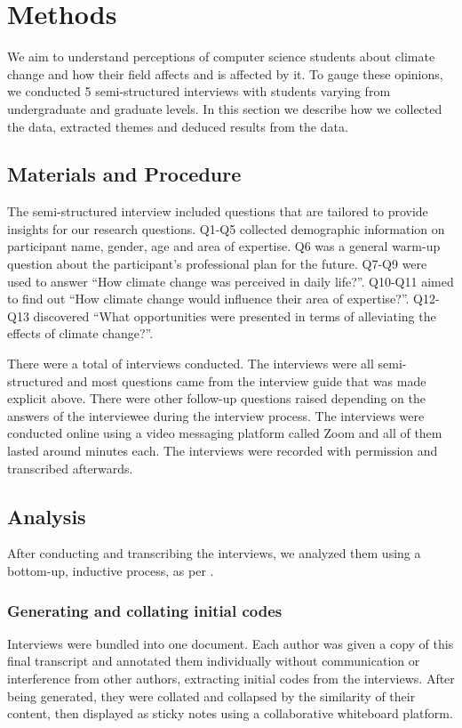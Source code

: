 

\section{Methods}

We aim to understand perceptions of computer science students about climate change and how their field affects and is affected by it. To gauge these opinions, we conducted 5 semi-structured interviews with students varying from undergraduate and graduate levels. In this section we describe how we collected the data, extracted themes and deduced results from the data.

\subsection{Materials and Procedure}
The semi-structured interview included  questions that are tailored to provide insights for our research questions. Q1-Q5 collected demographic information on participant name, gender, age and area of expertise. Q6 was a general warm-up question about the participant’s professional plan for the future. Q7-Q9 were used to answer “How climate change was perceived in daily life?”. Q10-Q11 aimed to find out “How climate change would influence their area of expertise?”. Q12-Q13 discovered “What opportunities were presented in terms of alleviating the effects of climate change?”. 

There were a total of  interviews conducted. The interviews were all semi-structured and most questions came from the interview guide that was made explicit above. There were other follow-up questions raised depending on the answers of the interviewee during the interview process. The interviews were conducted online using a video messaging platform called Zoom and all of them lasted around  minutes each. The interviews were recorded with permission and transcribed afterwards. 


\subsection{Analysis}
After conducting and transcribing the interviews, we analyzed them using a bottom-up, inductive process, as per \citet{braun2006using}.

\subsubsection{Generating and collating initial codes} Interviews were bundled into one document. Each author was given a copy of this final transcript and annotated them individually without communication or interference from other authors, extracting initial codes from the interviews. After being generated, they were collated and collapsed by the similarity of their content, then displayed as sticky notes using a collaborative whiteboard platform.

